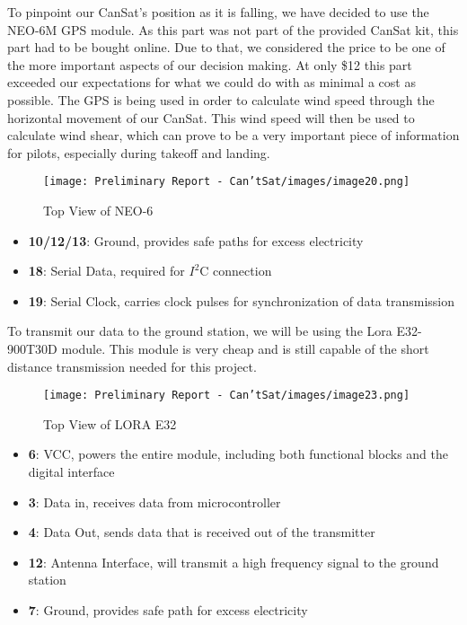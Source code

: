 \documentclass[10pt,twocolumn]{article}
\begin{document}
To pinpoint our CanSat’s position as it is falling, we have decided to use the NEO-6M GPS module. As this part was not part of the provided CanSat kit, this part had to be bought online. Due to that, we considered the price to be one of the more important aspects of our decision making. At only \$12 this part exceeded our expectations for what we could do with as minimal a cost as possible. The GPS is being used in order to calculate wind speed through the horizontal movement of our CanSat. This wind speed will then be used to calculate wind shear, which can prove to be a very important piece of information for pilots, especially during takeoff and landing.

\begin{figure}[H]
\centering
\texttt{[image: Preliminary Report - Can'tSat/images/image20.png]}  
\caption{\label{fig:NEO-6} Top View of NEO-6}
\end{figure}

\begin {itemize}
\item \textbf{10/12/13}: Ground, provides safe paths for excess electricity
\item \textbf{18}: Serial Data, required for $I^2$C connection
\item \textbf{19}: Serial Clock, carries clock pulses for synchronization of data transmission
\end {itemize}

To transmit our data to the ground station, we will be using the Lora E32-900T30D module. This module is very cheap and is still capable of the short distance transmission needed for this project.

\begin{figure}[H]
\centering
\texttt{[image: Preliminary Report - Can'tSat/images/image23.png]}  
\caption{\label{fig:LORA E32} Top View of LORA E32}
\end{figure}

\begin {itemize}
\item \textbf{6}: VCC, powers the entire module, including both functional blocks and the digital interface
\item \textbf{3}: Data in, receives data from microcontroller
\item \textbf{4}: Data Out, sends data that is received out of the transmitter
\item \textbf{12}: Antenna Interface, will transmit a high frequency signal to the ground station
\item \textbf{7}: Ground, provides safe path for excess electricity
\end {itemize}
\end{document}
